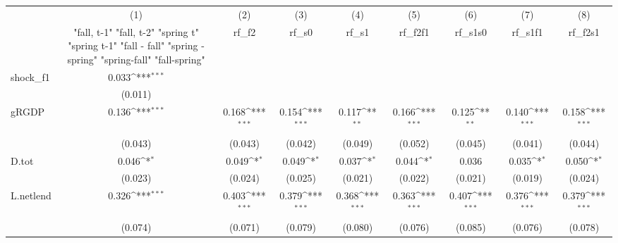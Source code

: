 {
\def\sym#1{\ifmmode^{#1}\else\(^{#1}\)\fi}
\begin{tabular}{l*{8}{c}}
\toprule
            &\multicolumn{1}{c}{(1)}&\multicolumn{1}{c}{(2)}&\multicolumn{1}{c}{(3)}&\multicolumn{1}{c}{(4)}&\multicolumn{1}{c}{(5)}&\multicolumn{1}{c}{(6)}&\multicolumn{1}{c}{(7)}&\multicolumn{1}{c}{(8)}\\
            &\multicolumn{1}{c}{  "fall, t-1" "fall, t-2" "spring t" "spring t-1"  "fall - fall" "spring - spring" "spring-fall" "fall-spring" }&\multicolumn{1}{c}{rf\_f2}&\multicolumn{1}{c}{rf\_s0}&\multicolumn{1}{c}{rf\_s1}&\multicolumn{1}{c}{rf\_f2f1}&\multicolumn{1}{c}{rf\_s1s0}&\multicolumn{1}{c}{rf\_s1f1}&\multicolumn{1}{c}{rf\_f2s1}\\
\midrule
shock\_f1    &       0.033\sym{***}&                     &                     &                     &                     &                     &                     &                     \\
            &     (0.011)         &                     &                     &                     &                     &                     &                     &                     \\
\addlinespace
gRGDP       &       0.136\sym{***}&       0.168\sym{***}&       0.154\sym{***}&       0.117\sym{**} &       0.166\sym{***}&       0.125\sym{**} &       0.140\sym{***}&       0.158\sym{***}\\
            &     (0.043)         &     (0.043)         &     (0.042)         &     (0.049)         &     (0.052)         &     (0.045)         &     (0.041)         &     (0.044)         \\
\addlinespace
D.tot       &       0.046\sym{*}  &       0.049\sym{*}  &       0.049\sym{*}  &       0.037\sym{*}  &       0.044\sym{*}  &       0.036         &       0.035\sym{*}  &       0.050\sym{*}  \\
            &     (0.023)         &     (0.024)         &     (0.025)         &     (0.021)         &     (0.022)         &     (0.021)         &     (0.019)         &     (0.024)         \\
\addlinespace
L.netlend   &       0.326\sym{***}&       0.403\sym{***}&       0.379\sym{***}&       0.368\sym{***}&       0.363\sym{***}&       0.407\sym{***}&       0.376\sym{***}&       0.379\sym{***}\\
            &     (0.074)         &     (0.071)         &     (0.079)         &     (0.080)         &     (0.076)         &     (0.085)         &     (0.076)         &     (0.078)         \\

\end{tabular}}

